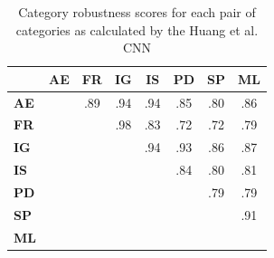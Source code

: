 \documentclass[letterpaper, 12 pt, conference]{ieeeconf}
\begin{document}
\begin{table}[t!]
    \centering
    \begin{tabular}{lccccccc}
        \toprule
            &
            \multicolumn{1}{c}{\textbf{AE}} & \multicolumn{1}{c}{\textbf{FR}} & \multicolumn{1}{c}{\textbf{IG}} & \multicolumn{1}{c}{\textbf{IS}} & \multicolumn{1}{c}{\textbf{PD}} & \multicolumn{1}{c}{\textbf{SP}} & \multicolumn{1}{c}{\textbf{ML}} \\
        \midrule
            \textbf{AE} & & .89 & .94 & .94 & .85 & .80 & .86 \\
            \textbf{FR} & &     & .98 & .83 & .72 & .72 & .79 \\
            \textbf{IG} & &     &     & .94 & .93 & .86 & .87 \\
            \textbf{IS} & &     &     &     & .84 & .80 & .81 \\ 
            \textbf{PD} & &     &     &     &     & .79 & .79 \\ 
            \textbf{SP} & &     &     &     &     &     & .91 \\ 
            \textbf{ML} & &     &     &     &     &     &     \\ 
        \bottomrule
    \end{tabular}
    \caption{Category robustness scores for each pair of categories as calculated by the Huang et al. CNN \cite{huang:aim:2018}}
    \label{table:cnn}
\end{table}
\end{document}
